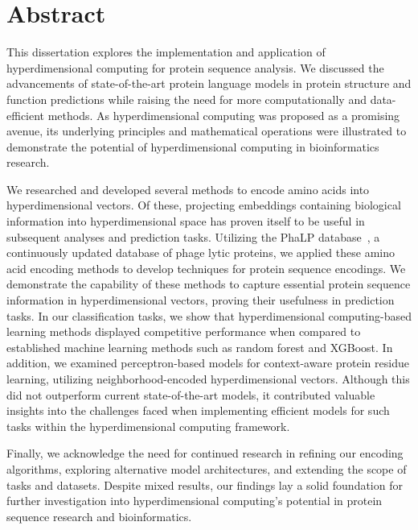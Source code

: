\chapter{Abstract}
This dissertation explores the implementation and application of hyperdimensional computing for protein sequence analysis. We discussed the advancements of state-of-the-art protein language models in protein structure and function predictions while raising the need for more computationally and data-efficient methods. As hyperdimensional computing was proposed as a promising avenue, its underlying principles and mathematical operations were illustrated to demonstrate the potential of hyperdimensional computing in bioinformatics research. 

We researched and developed several methods to encode amino acids into hyperdimensional vectors. Of these, projecting embeddings containing biological information into hyperdimensional space has proven itself to be useful in subsequent analyses and prediction tasks. Utilizing the PhaLP database~\cite{phalp}, a continuously updated database of phage lytic proteins, we applied these amino acid encoding methods to develop techniques for protein sequence encodings. We demonstrate the capability of these methods to capture essential protein sequence information in hyperdimensional vectors, proving their usefulness in prediction tasks. In our classification tasks, we show that hyperdimensional computing-based learning methods displayed competitive performance when compared to established machine learning methods such as random forest and XGBoost. In addition, we examined perceptron-based models for context-aware protein residue learning, utilizing neighborhood-encoded hyperdimensional vectors. Although this did not outperform current state-of-the-art models, it contributed valuable insights into the challenges faced when implementing efficient models for such tasks within the hyperdimensional computing framework. 

Finally, we acknowledge the need for continued research in refining our encoding algorithms, exploring alternative model architectures, and extending the scope of tasks and datasets. Despite mixed results, our findings lay a solid foundation for further investigation into hyperdimensional computing's potential in protein sequence research and bioinformatics.